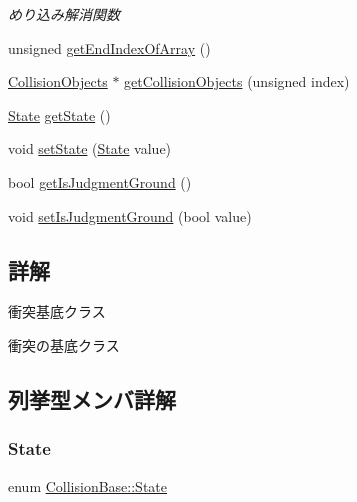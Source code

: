 \begin{DoxyCompactItemize}
\begin{DoxyCompactList}\small\item\em めり込み解消関数 \end{DoxyCompactList}\item 
unsigned \mbox{\hyperlink{class_collision_base_ac1d7000c820fabfa604138cda30a40a1}{get\+End\+Index\+Of\+Array}} ()
\item 
\mbox{\hyperlink{class_collision_objects}{Collision\+Objects}} $\ast$ \mbox{\hyperlink{class_collision_base_a2e54e04c6ebd809ac2bc955083fec61c}{get\+Collision\+Objects}} (unsigned index)
\item 
\mbox{\hyperlink{class_collision_base_a4dd1ed00099a19c0176913af93c4e365}{State}} \mbox{\hyperlink{class_collision_base_af4e773951a4e1965e64410841a0292a4}{get\+State}} ()
\item 
void \mbox{\hyperlink{class_collision_base_a01db1e666b8e71c33969e9ab6bbc724e}{set\+State}} (\mbox{\hyperlink{class_collision_base_a4dd1ed00099a19c0176913af93c4e365}{State}} value)
\item 
bool \mbox{\hyperlink{class_collision_base_a7b9cd927976308f8719f3becc03b99a1}{get\+Is\+Judgment\+Ground}} ()
\item 
void \mbox{\hyperlink{class_collision_base_a231cb5c715701444db63db030c06b694}{set\+Is\+Judgment\+Ground}} (bool value)
\end{DoxyCompactItemize}


\subsection{詳解}
衝突基底クラス 

衝突の基底クラス 

\subsection{列挙型メンバ詳解}
\mbox{\label{class_collision_base_a4dd1ed00099a19c0176913af93c4e365}} 
\subsubsection{\texorpdfstring{State}{State}}
{\footnotesize\ttfamily enum \mbox{\hyperlink{class_collision_base_a4dd1ed00099a19c0176913af93c4e365}{Collision\+Base\+::\+State}}}

